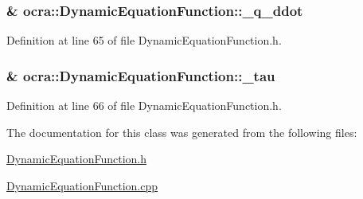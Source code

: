 \subsubsection[{\texorpdfstring{\+\_\+q\+\_\+ddot}{_q_ddot}}]{\& ocra\+::\+Dynamic\+Equation\+Function\+::\+\_\+q\+\_\+ddot\hspace{0.3cm}{\ttfamily [protected]}}\hypertarget{classocra_1_1DynamicEquationFunction_a8a6dfb64fcca3c42a9e7ad637706a6cc}{}\label{classocra_1_1DynamicEquationFunction_a8a6dfb64fcca3c42a9e7ad637706a6cc}


Definition at line 65 of file Dynamic\+Equation\+Function.\+h.

\subsubsection[{\texorpdfstring{\+\_\+tau}{_tau}}]{\& ocra\+::\+Dynamic\+Equation\+Function\+::\+\_\+tau\hspace{0.3cm}{\ttfamily [protected]}}\hypertarget{classocra_1_1DynamicEquationFunction_a60ba636a9028046969c5491ec7ed2f9e}{}\label{classocra_1_1DynamicEquationFunction_a60ba636a9028046969c5491ec7ed2f9e}


Definition at line 66 of file Dynamic\+Equation\+Function.\+h.



The documentation for this class was generated from the following files\+:\begin{DoxyCompactItemize}
\item 
\hyperlink{DynamicEquationFunction_8h}{Dynamic\+Equation\+Function.\+h}\item 
\hyperlink{DynamicEquationFunction_8cpp}{Dynamic\+Equation\+Function.\+cpp}\end{DoxyCompactItemize}
